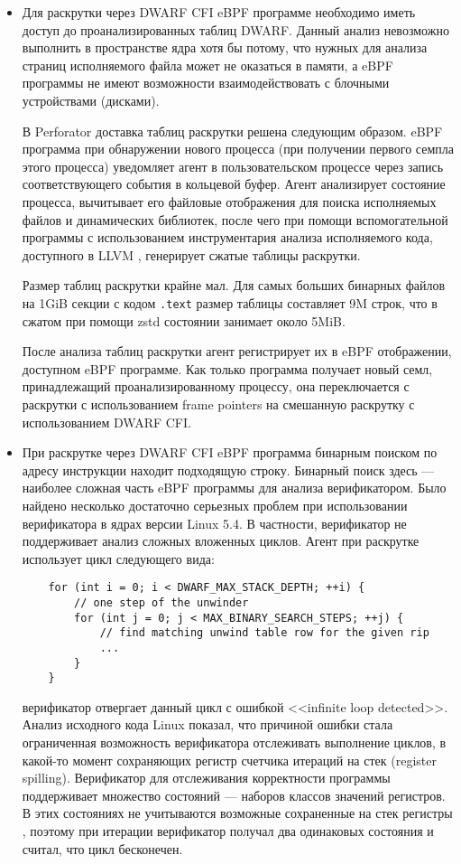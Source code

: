\begin{itemize}
    \item
    Для раскрутки через DWARF CFI eBPF программе необходимо иметь доступ до проанализированных таблиц DWARF.
    Данный анализ невозможно выполнить в пространстве ядра хотя бы потому, что нужных для анализа страниц исполняемого файла может не
    оказаться в памяти, а eBPF программы не имеют возможности взаимодействовать с блочными устройствами (дисками).

    В Perforator доставка таблиц раскрутки решена следующим образом.
    eBPF программа при обнаружении нового процесса (при получении первого семпла этого процесса) уведомляет
    агент в пользовательском процессе через запись соответствующего события в кольцевой буфер.
    Агент анализирует состояние процесса, вычитывает его файловые отображения для поиска исполняемых файлов и динамических библиотек,
    после чего при помощи вспомогательной программы с использованием инструментария анализа исполняемого кода, доступного в LLVM \cite{llvm},
    генерирует сжатые таблицы раскрутки.

    Размер таблиц раскрутки крайне мал. Для самых больших бинарных файлов на 1GiB секции с кодом \verb!.text!
    размер таблицы составляет 9M строк, что в сжатом при помощи zstd \cite{zstd} состоянии занимает около 5MiB.

    После анализа таблиц раскрутки агент регистрирует их в eBPF отображении, доступном eBPF программе.
    Как только программа получает новый семл, принадлежащий проанализированному процессу,
    она переключается с раскрутки с использованием frame pointers на смешанную раскрутку с использованием DWARF CFI.

    \item
    При раскрутке через DWARF CFI eBPF программа бинарным поиском по адресу инструкции находит подходящую строку.
    Бинарный поиск здесь --- наиболее сложная часть eBPF программы для анализа верификатором.
    Было найдено несколько достаточно серьезных проблем при использовании верификатора в ядрах версии Linux 5.4.
    В частности, верификатор не поддерживает анализ сложных вложенных циклов.
    Агент при раскрутке использует цикл следующего вида:
    \begin{verbatim}
    for (int i = 0; i < DWARF_MAX_STACK_DEPTH; ++i) {
        // one step of the unwinder
        for (int j = 0; j < MAX_BINARY_SEARCH_STEPS; ++j) {
            // find matching unwind table row for the given rip
            ...
        }
    }
    \end{verbatim}
    верификатор отвергает данный цикл с ошибкой <<infinite loop detected>>.
    Анализ исходного кода Linux показал, что причиной ошибки стала ограниченная возможность верификатора отслеживать
    выполнение циклов, в какой-то момент сохраняющих регистр счетчика итераций на стек (register spilling).
    Верификатор для отслеживания корректности программы поддерживает множество состояний --- наборов классов значений регистров.
    В этих состояниях не учитываются возможные сохраненные на стек регистры \cite{bpf:loop}, поэтому при итерации
    верификатор получал два одинаковых состояния и считал, что цикл бесконечен.


\end{itemize}
